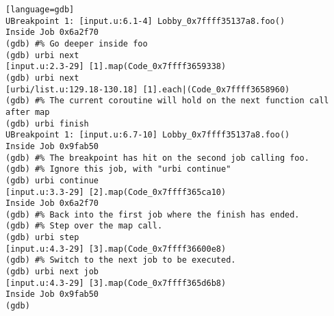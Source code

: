 \begin{description}
\begin{verbatim}[language=gdb]
UBreakpoint 1: [input.u:6.1-4] Lobby_0x7ffff35137a8.foo()
Inside Job 0x6a2f70
(gdb) #% Go deeper inside foo
(gdb) urbi next
[input.u:2.3-29] [1].map(Code_0x7ffff3659338)
(gdb) urbi next
[urbi/list.u:129.18-130.18] [1].each|(Code_0x7ffff3658960)
(gdb) #% The current coroutine will hold on the next function call after map
(gdb) urbi finish
UBreakpoint 1: [input.u:6.7-10] Lobby_0x7ffff35137a8.foo()
Inside Job 0x9fab50
(gdb) #% The breakpoint has hit on the second job calling foo.
(gdb) #% Ignore this job, with "urbi continue"
(gdb) urbi continue
[input.u:3.3-29] [2].map(Code_0x7ffff365ca10)
Inside Job 0x6a2f70
(gdb) #% Back into the first job where the finish has ended.
(gdb) #% Step over the map call.
(gdb) urbi step
[input.u:4.3-29] [3].map(Code_0x7ffff36600e8)
(gdb) #% Switch to the next job to be executed.
(gdb) urbi next job
[input.u:4.3-29] [3].map(Code_0x7ffff365d6b8)
Inside Job 0x9fab50
(gdb)
\end{verbatim}

\end{description}


